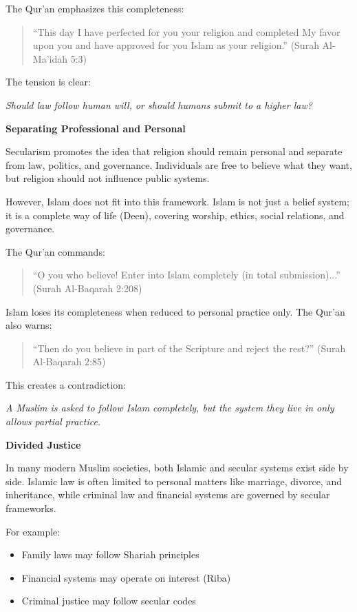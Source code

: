\documentclass[12pt]{article}
\begin{document}
The Qur’an emphasizes this completeness:

\begin{quote}
``This day I have perfected for you your religion and completed My favor upon you and have approved for you Islam as your religion.'' (Surah Al-Ma’idah 5:3)
\end{quote}

The tension is clear:

\textit{Should law follow human will, or should humans submit to a higher law?}

\textbf{Separating Professional and Personal}

Secularism promotes the idea that religion should remain personal and separate from law, politics, and governance. Individuals are free to believe what they want, but religion should not influence public systems.

However, Islam does not fit into this framework. Islam is not just a belief system; it is a complete way of life (Deen), covering worship, ethics, social relations, and governance.

The Qur’an commands:

\begin{quote}
``O you who believe! Enter into Islam completely (in total submission)...'' (Surah Al-Baqarah 2:208)
\end{quote}

Islam loses its completeness when reduced to personal practice only. The Qur’an also warns:

\begin{quote}
``Then do you believe in part of the Scripture and reject the rest?'' (Surah Al-Baqarah 2:85)
\end{quote}

This creates a contradiction:

\textit{A Muslim is asked to follow Islam completely, but the system they live in only allows partial practice.}

\textbf{Divided Justice}

In many modern Muslim societies, both Islamic and secular systems exist side by side. Islamic law is often limited to personal matters like marriage, divorce, and inheritance, while criminal law and financial systems are governed by secular frameworks.

For example:
\begin{itemize}
\item Family laws may follow Shariah principles
\item Financial systems may operate on interest (Riba)
\item Criminal justice may follow secular codes
\end{itemize}
\end{document}
